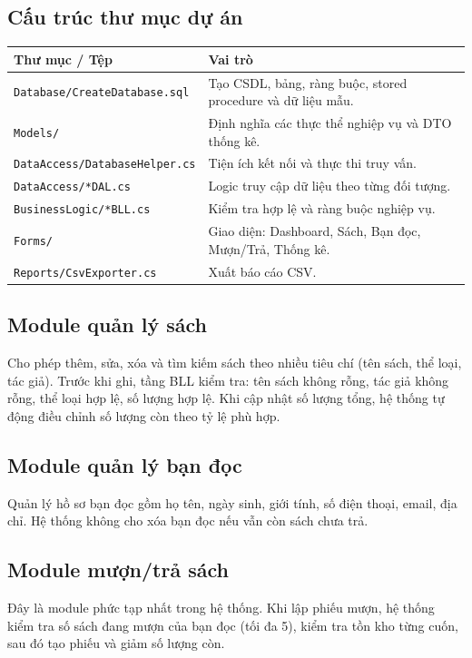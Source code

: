 \documentclass[12pt,a4paper]{article}
\begin{document}
\subsection{Cấu trúc thư mục dự án}
\begin{longtable}{p{4.2cm}p{10.3cm}}
\toprule
\textbf{Thư mục / Tệp} & \textbf{Vai trò} \\
\midrule
\endhead
\texttt{Database/CreateDatabase.sql} & Tạo CSDL, bảng, ràng buộc, stored procedure và dữ liệu mẫu. \\
\texttt{Models/} & Định nghĩa các thực thể nghiệp vụ và DTO thống kê. \\
\texttt{DataAccess/DatabaseHelper.cs} & Tiện ích kết nối và thực thi truy vấn. \\
\texttt{DataAccess/*DAL.cs} & Logic truy cập dữ liệu theo từng đối tượng. \\
\texttt{BusinessLogic/*BLL.cs} & Kiểm tra hợp lệ và ràng buộc nghiệp vụ. \\
\texttt{Forms/} & Giao diện: Dashboard, Sách, Bạn đọc, Mượn/Trả, Thống kê. \\
\texttt{Reports/CsvExporter.cs} & Xuất báo cáo CSV. \\
\bottomrule
\end{longtable}

\subsection{Module quản lý sách}
Cho phép thêm, sửa, xóa và tìm kiếm sách theo nhiều tiêu chí (tên sách, thể loại, tác giả). Trước khi ghi, tầng BLL kiểm tra: tên sách không rỗng, tác giả không rỗng, thể loại hợp lệ, số lượng hợp lệ. Khi cập nhật số lượng tổng, hệ thống tự động điều chỉnh số lượng còn theo tỷ lệ phù hợp.

\subsection{Module quản lý bạn đọc}
Quản lý hồ sơ bạn đọc gồm họ tên, ngày sinh, giới tính, số điện thoại, email, địa chỉ. Hệ thống không cho xóa bạn đọc nếu vẫn còn sách chưa trả.

\subsection{Module mượn/trả sách}
Đây là module phức tạp nhất trong hệ thống. Khi lập phiếu mượn, hệ thống kiểm tra số sách đang mượn của bạn đọc (tối đa 5), kiểm tra tồn kho từng cuốn, sau đó tạo phiếu và giảm số lượng còn.
\end{document}
